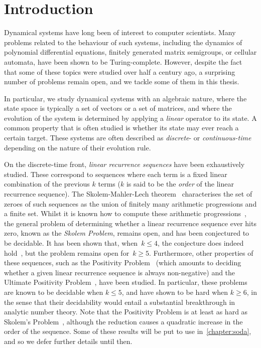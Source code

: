 \chapter{Introduction}
\label{sec:introduction}

Dynamical systems have long been of interest to computer scientists. Many problems related to the behaviour of such systems, including the dynamics of polynomial differential equations, finitely generated matrix semigroups, or cellular automata, have been shown to be Turing-complete. However, despite the fact that some of these topics were studied over half a century ago, a surprising number of problems remain open, and we tackle some of them in this thesis.

In particular, we study dynamical systems with an algebraic nature, where the state space is typically a set of vectors or a set of matrices, and where the evolution of the system is determined by applying a \emph{linear} operator to its state. A common property that is often studied is whether its state may ever reach a certain target. These systems are often described as \emph{discrete}- or \emph{continuous-time} depending on the nature of their evolution rule.

On the discrete-time front, \emph{linear recurrence sequences} have been exhaustively studied. These correspond to sequences where each term is a fixed linear combination of the previous $k$ terms ($k$ is said to be the \emph{order} of the linear recurrence sequence). The Skolem-Mahler-Lech theorem~\cite{Sko34,Mah35,Lec53,Hansel85} characterises the set of zeroes of such sequences as the union of finitely many arithmetic progressions and a finite set. Whilst it is known how to compute these
arithmetic progressions~\cite{BM76}, the general problem of determining whether a linear recurrence sequence ever hits zero, known as the \emph{Skolem Problem}, remains open, and has been conjectured to be decidable. It has been shown that, when~$k \leq 4$, the conjecture does indeed hold~\cite{Ver85}, but the problem remains open for~$k\geq 5$.
Furthermore, other properties of these sequences, such as the Positivity Problem~\cite{BG07,HHH06,LT09,OW13:constructive-positivity,OW14:SODA,Liu10} (which amounts to deciding whether a given linear recurrence sequence is always non-negative) and the Ultimate Positivity Problem~\cite{OuaknineW13b}, have been studied.
In particular, these problems are known to be decidable when $k \leq 5$, and have shown to be hard when $k \geq 6$, in the sense that their decidability would entail a substantial breakthrough in analytic number theory. Note that the Positivity Problem is at least as hard as Skolem's Problem~\cite{OW14:SODA}, although the reduction causes a quadratic increase in the order of the sequence. Some of these results will be put to use in~\cref{chapter:soda}, and so we defer further details until then.

